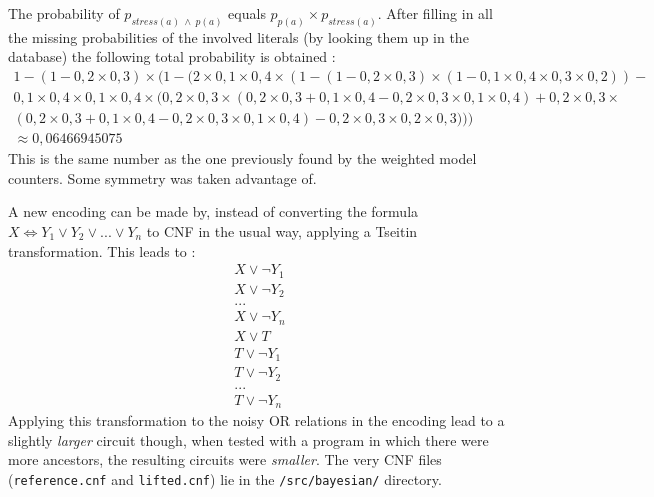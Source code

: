 The probability of $p_{stress(a)\ \land\ p(a)}$ equals $p_{p(a)}\times p_{stress(a)}$.
After filling in all the missing probabilities of the involved literals (by looking them up in the database) the following total probability is obtained :
\begin{gather*}
1-(1-0,2\times 0,3)\times (1-(2\times 0,1\times 0,4\times (1-(1-0,2\times 0,3)\times (1-0,1\times 0,4\times 0,3\times 0,2))-\\
0,1\times 0,4\times 0,1\times 0,4\times (0,2\times 0,3\times (0,2\times 0,3+0,1\times 0,4-0,2\times 0,3\times 0,1\times 0,4)+0,2\times 0,3\times\\ 
(0,2\times 0,3+0,1\times 0,4-0,2\times 0,3\times 0,1\times 0,4)-0,2\times 0,3\times 0,2\times 0,3)))\\
\approx 0,06466945075
\end{gather*}This is the same number as the one previously found by the weighted model counters. Some symmetry was taken advantage of.


A new encoding can be made by, instead of converting the formula $X\Leftrightarrow Y_1\lor Y_2 \lor ... \lor Y_n$ to CNF in the usual way, applying a Tseitin transformation. This leads to :
\begin{gather*}
X \lor \lnot Y_1\\
X \lor \lnot Y_2\\
...\\
X \lor \lnot Y_n\\
X \lor T\\
T \lor \lnot Y_1\\
T \lor \lnot Y_2\\
...\\
T \lor \lnot Y_n
\end{gather*}
Applying this transformation to the noisy OR relations in the encoding lead to a slightly \textit{larger} circuit though, when tested with a program in which there were more ancestors, the resulting circuits were \textit{smaller}. The very CNF files (\texttt{reference.cnf} and \texttt{lifted.cnf}) lie in the \texttt{/src/bayesian/} directory.